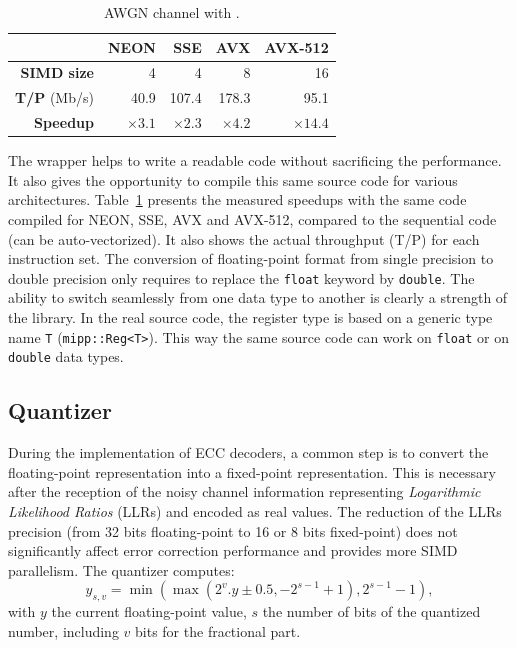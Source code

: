 \begin{table}[htp]
  \centering
  \caption{AWGN channel with \MIPP.}
  \label{lst:opt_simu_awgn_speedup}
  \begin{tabular}{r | r  r r r}
                      & \textbf{NEON} & \textbf{SSE} & \textbf{AVX} & \textbf{AVX-512} \\ \hline \hline
  \textbf{SIMD size}  & 4             & 4            & 8            & 16               \\ %
  \textbf{T/P} (Mb/s) & 40.9          & 107.4        & 178.3        & 95.1             \\ %
  \textbf{Speedup}    & $\times 3.1$  & $\times 2.3$ & $\times 4.2$ & $\times 14.4$    \\
  \end{tabular}
\end{table}

The \MIPP wrapper helps to write a readable code without sacrificing the
performance. It also gives the opportunity to compile this same source code for
various architectures. Table~\ref{lst:opt_simu_awgn_speedup} presents the
measured speedups with the same \MIPP code compiled for NEON, SSE, AVX and
AVX-512, compared to the sequential code (can be auto-vectorized). It also shows
the actual throughput (T/P) for each instruction set. The conversion of
floating-point format from single precision to double precision only requires to
replace the \verb|float| keyword by \verb|double|. The ability to switch
seamlessly from one data type to another is clearly a strength of the \MIPP
library. In the real source code, the register type is based on a generic type
name \verb|T| (\verb|mipp::Reg<T>|). This way the same source code can work on
\verb|float| or on \verb|double| data types.

\subsection{Quantizer}
\label{sec:opt_simu_quantizer}

During the implementation of ECC decoders, a common step is to convert the
floating-point representation into a fixed-point representation. This is
necessary after the reception of the noisy channel information representing
\textit{Logarithmic Likelihood Ratios} (LLRs) and encoded as real values. The
reduction of the LLRs precision (from 32 bits floating-point to 16 or 8 bits
fixed-point) does not significantly affect error correction performance and
provides more SIMD parallelism. The quantizer computes:
\begin{equation*}
y_{s,v} = \min(\max(2^v . y \pm 0.5, -2^{s-1} +1), 2^{s-1} -1),
\end{equation*}
with $y$ the current floating-point value, $s$ the number of bits of the
quantized number, including $v$ bits for the fractional part.

